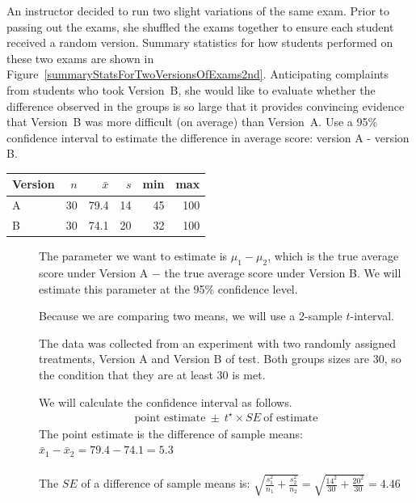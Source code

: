 \begin{examplewrap}
\begin{nexample}
{
An instructor decided to run two slight variations of the same exam. Prior to passing out the exams, she shuffled the exams together to ensure each student received a random version. Summary statistics for how students performed on these two exams are shown in Figure~\ref{summaryStatsForTwoVersionsOfExams2nd}. Anticipating complaints from students who took Version~B, she would like to evaluate whether the difference observed in the groups is so large that it provides convincing evidence that Version~B was more difficult (on average) than Version~A.  Use a 95\% confidence interval to estimate the difference in average score: version A - version B.

\begin{center}
\begin{tabular}{l rrrrr}
\hline
Version\hspace{2mm}	& $n$	& $\bar{x}$	& $s$	& min	& max  \\
\hline
A		& 30		& 79.4		& 14 	& 45		& 100 \\
B		& 30		& 74.1		& 20		& 32		& 100 \\
\hline
\end{tabular}
\end{center}
\label{summaryStatsForTwoVersionsOfExams2nd}

}
\begin{description}
\item[] The parameter we want to estimate is $\mu_{1}-\mu_2$, which is the true average score under Version A $-$ the true average score under Version B.  We will estimate this parameter at the 95\% confidence level.

\item[] Because we are comparing two means, we will use a 2-sample $t$-interval.

\item[] The data was collected from an experiment with two randomly assigned treatments, Version A and Version B of test.   Both groups sizes are 30, so the condition that they are at least 30 is met.   
\item[]  We will calculate the confidence interval as follows.
\begin{align*}
\text{point estimate}\ \pm\ t^{\star} \times SE\ \text{of estimate}
\end{align*}
The point estimate is the difference of sample means: $\bar{x}_1-\bar{x}_2 = 79.4 - 74.1 = 5.3$\\
\\
The $SE$ of a difference of sample means is:  $\sqrt{\frac{s_1^2}{n_1} + \frac{s_2^2}{n_2}} = \sqrt{\frac{14^2}{30} + \frac{20^2}{30}} = 4.46$ \\


\end{description}
\end{nexample}
\end{examplewrap}
